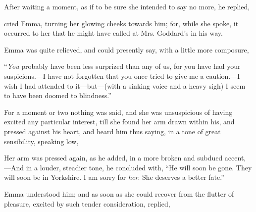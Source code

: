 
After waiting a moment, as if to be sure she intended to say no more, he replied,


 cried Emma, turning her glowing cheeks towards him; for, while she spoke, it occurred to her that he might have called at Mrs. Goddard's in his way.


Emma was quite relieved, and could presently say, with a little more composure,

“{\em You} probably have been less surprized than any of us, for you have had your suspicions.---I have not forgotten that you once tried to give me a caution.---I wish I had attended to it---but---(with a sinking voice and a heavy sigh) I seem to have been doomed to blindness.”

For a moment or two nothing was said, and she was unsuspicious of having excited any particular interest, till she found her arm drawn within his, and pressed against his heart, and heard him thus saying, in a tone of great sensibility, speaking low,

 Her arm was pressed again, as he added, in a more broken and subdued accent, ---And in a louder, steadier tone, he concluded with, “He will soon be gone. They will soon be in Yorkshire. I am sorry for {\em her}. She deserves a better fate.”

Emma understood him; and as soon as she could recover from the flutter of pleasure, excited by such tender consideration, replied,


